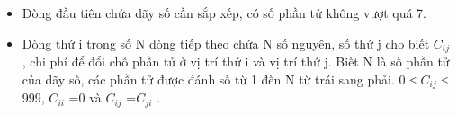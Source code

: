 \begin{itemize}
	\item Dòng đầu tiên chứa dãy số cần sắp xếp, có số phần tử không vượt quá 7.
	\item Dòng thứ i trong số N dòng tiếp theo chứa N số nguyên, số thứ j cho biết $C_{ij}$ , chi phí để đổi chỗ phần tử ở vị trí thứ i và vị trí thứ j. Biết N là số phần tử của dãy số, các phần tử được đánh số từ 1 đến N từ trái sang phải. 0 ≤ $C_{ij}$ ≤ 999, $C_{ii}$ =0 và $C_{ij}$ =$C_{ji}$ .
\end{itemize}